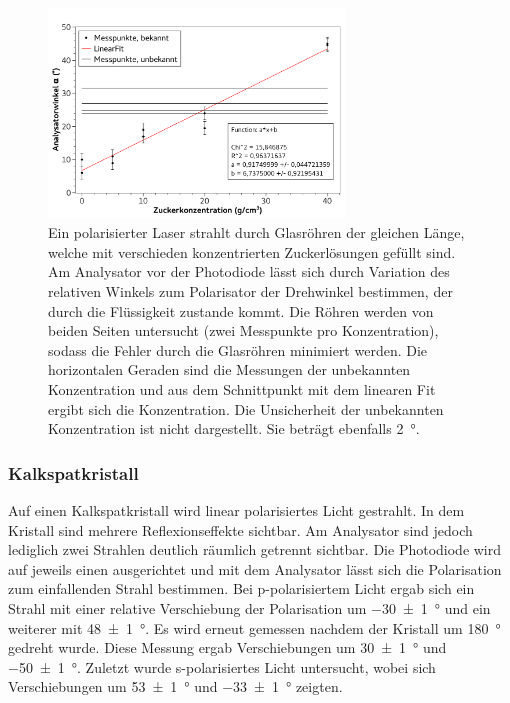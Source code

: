 \documentclass[
	a4paper,
	12pt,
	pagesize,
	ngerman
]{scrartcl}
\begin{document}
	\begin{figure}[H]
		\includegraphics[width=0.7\textwidth]{fig_Zucker}
		\centering
		\caption{Ein polarisierter Laser strahlt durch Glasröhren der gleichen Länge, welche mit verschieden konzentrierten Zuckerlösungen gefüllt sind. 
		Am Analysator vor der Photodiode lässt sich durch Variation des relativen Winkels zum Polarisator der Drehwinkel bestimmen, der durch die Flüssigkeit zustande kommt.
		Die Röhren werden von beiden Seiten untersucht (zwei Messpunkte pro Konzentration), sodass die Fehler durch die Glasröhren minimiert werden.
		Die horizontalen Geraden sind die Messungen der unbekannten Konzentration und aus dem Schnittpunkt mit dem linearen Fit ergibt sich die Konzentration.
		Die Unsicherheit der unbekannten Konzentration ist nicht dargestellt. Sie beträgt ebenfalls \SI{2}{\degree}.
		}
		\label{fig_zucker}
		\centering
	\end{figure}

	\subsubsection{Kalkspatkristall}
	Auf einen Kalkspatkristall wird linear polarisiertes Licht gestrahlt.
	In dem Kristall sind mehrere Reflexionseffekte sichtbar. 
	Am Analysator sind jedoch lediglich zwei Strahlen deutlich räumlich getrennt sichtbar.
	Die Photodiode wird auf jeweils einen ausgerichtet und mit dem Analysator lässt sich die Polarisation zum einfallenden Strahl bestimmen.
	Bei p-polarisiertem Licht ergab sich ein Strahl mit einer relative Verschiebung der Polarisation um \SI{-30+-1}{\degree} und ein weiterer mit \SI{48+-1}{\degree}.
	Es wird erneut gemessen nachdem der Kristall um \SI{180}{\degree} gedreht wurde.
	Diese Messung ergab Verschiebungen um \SI{30+-1}{\degree} und \SI{-50+-1}{\degree}.
	Zuletzt wurde s-polarisiertes Licht untersucht, wobei sich Verschiebungen um \SI{53+-1}{\degree} und \SI{-33+-1}{\degree} zeigten.
\end{document}
